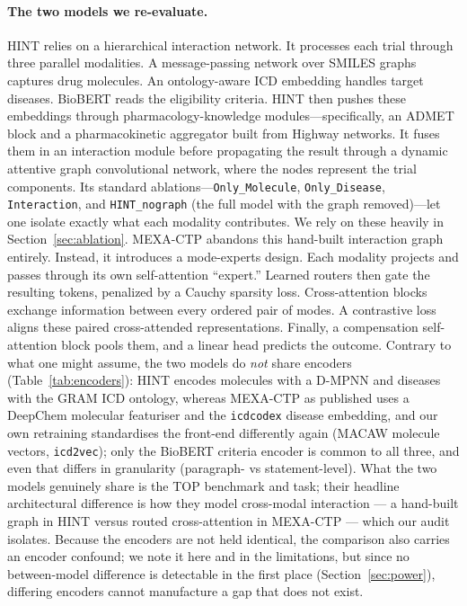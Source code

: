 \documentclass[a4paper,fleqn]{cas-sc}
\begin{document}
\paragraph{The two models we re-evaluate.} HINT \citep{fu2022hint} relies on a hierarchical interaction network. It processes each trial through three parallel modalities. A message-passing network over SMILES graphs captures drug molecules. An ontology-aware ICD embedding handles target diseases. BioBERT reads the eligibility criteria. HINT then pushes these embeddings through pharmacology-knowledge modules---specifically, an ADMET block and a pharmacokinetic aggregator built from Highway networks. It fuses them in an interaction module before propagating the result through a dynamic attentive graph convolutional network, where the nodes represent the trial components. Its standard ablations---\texttt{Only\_Molecule}, \texttt{Only\_Disease}, \texttt{Interaction}, and \texttt{HINT\_nograph} (the full model with the graph removed)---let one isolate exactly what each modality contributes. We rely on these heavily in Section~\ref{sec:ablation}.
MEXA-CTP \citep{zhang2025mexactp} abandons this hand-built interaction graph entirely. Instead, it introduces a mode-experts design. Each modality projects and passes through its own self-attention ``expert.'' Learned routers then gate the resulting tokens, penalized by a Cauchy sparsity loss. Cross-attention blocks exchange information between every ordered pair of modes. A contrastive loss aligns these paired cross-attended representations. Finally, a compensation self-attention block pools them, and a linear head predicts the outcome. Contrary to what one might assume, the two models do \emph{not} share encoders (Table~\ref{tab:encoders}): HINT encodes molecules with a D-MPNN and diseases with the GRAM ICD ontology, whereas MEXA-CTP as published uses a DeepChem molecular featuriser and the \texttt{icdcodex} disease embedding, and our own retraining standardises the front-end differently again (MACAW molecule vectors, \texttt{icd2vec}); only the BioBERT criteria encoder is common to all three, and even that differs in granularity (paragraph- vs statement-level). What the two models genuinely share is the TOP benchmark and task; their headline architectural difference is how they model cross-modal interaction --- a hand-built graph in HINT versus routed cross-attention in MEXA-CTP --- which our audit isolates. Because the encoders are not held identical, the comparison also carries an encoder confound; we note it here and in the limitations, but since no between-model difference is detectable in the first place (Section~\ref{sec:power}), differing encoders cannot manufacture a gap that does not exist.
\end{document}
